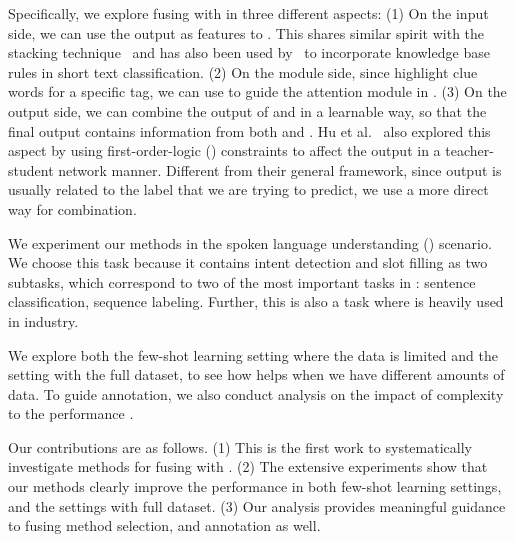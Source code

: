 

Specifically, we explore fusing \RE with \NN in three different aspects: (1) On the \NN input side, we can use the \RE output as features
to \NN. This shares similar spirit with the stacking technique~\cite{wolpert1992stacked} and has also been used by~\cite{wang2017combining}
to incorporate knowledge base rules in short text classification.
(2) On the \NN module side, since \REs highlight clue words for a
specific tag, we can use \RE to guide the attention module in \NN. (3) On the \NN output side, we can combine the output of \RE and \NN in
a learnable way, so that the final output contains information from both \NN and \RE. Hu et al.~ also explored
this aspect by using first-order-logic (\FOL) constraints to affect the \NN output in a teacher-student network manner. Different from
their general framework, since \RE output is usually related to the label that we are trying to predict, we use a more direct way for
combination.

We experiment our methods in the spoken language understanding (\SLU) scenario. We choose this task because it contains intent detection
and slot filling as two subtasks, which correspond to two of the most important tasks in \NLP: sentence classification, sequence labeling.
Further, this is also a task where \RE is heavily used in industry.

We explore both the few-shot learning setting where the data is limited and the setting with the full dataset, to see how \RE helps when we have different amounts of data.
To guide \RE annotation, we also conduct analysis on the impact of \RE complexity to the performance \NN.

Our contributions are as follows. (1) This is the first work to systematically investigate methods for fusing \RE with \NN. (2) The
extensive experiments show that our methods clearly improve the \NN performance in both few-shot learning settings, and the settings with
full dataset. (3) Our analysis provides meaningful guidance to fusing method selection, and \RE annotation as well.
